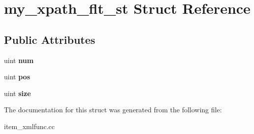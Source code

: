 \hypertarget{structmy__xpath__flt__st}{}\section{my\+\_\+xpath\+\_\+flt\+\_\+st Struct Reference}
\label{structmy__xpath__flt__st}
\subsection*{Public Attributes}
\begin{DoxyCompactItemize}
\item 
\mbox{\label{structmy__xpath__flt__st_a3e2d6f46bbd4a25a28cdf3fe17aca0dc}} 
uint {\bfseries num}
\item 
\mbox{\label{structmy__xpath__flt__st_a1cfab233a7c07b98867f8cc6203121be}} 
uint {\bfseries pos}
\item 
\mbox{\label{structmy__xpath__flt__st_a5fdc4334baf827e6a25625793188e07a}} 
uint {\bfseries size}
\end{DoxyCompactItemize}


The documentation for this struct was generated from the following file\+:\begin{DoxyCompactItemize}
\item 
item\+\_\+xmlfunc.\+cc\end{DoxyCompactItemize}
